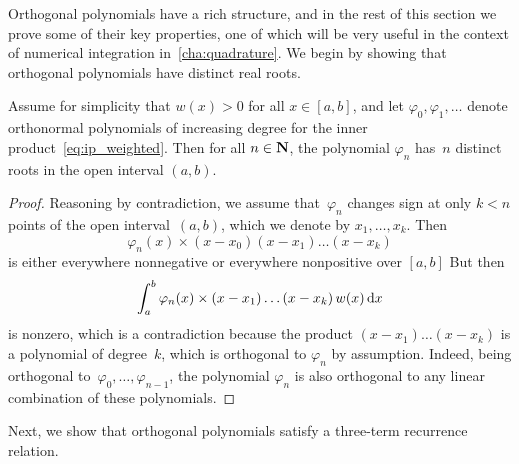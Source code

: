 Orthogonal polynomials have a rich structure,
and in the rest of this section we prove some of their key properties,
one of which will be very useful in the context of numerical integration in~\cref{cha:quadrature}.
We begin by showing that
orthogonal polynomials have distinct real roots.
\begin{proposition}
    \label{proposition:distinct_roots}
    Assume for simplicity that $w(x) > 0$ for all $x \in [a, b]$,
    and let $\varphi_0, \varphi_1, \dotsc$ denote orthonormal polynomials of increasing degree for the inner product~\eqref{eq:ip_weighted}.
    Then for all $n \in \mathbf N$,
    the polynomial $\varphi_n$ has~$n$ distinct roots in the open interval $(a, b)$.
\end{proposition}
\begin{proof}
    Reasoning by contradiction,
    we assume that~$\varphi_n$ changes sign at only $k < n$ points of the open interval~$(a, b)$,
    which we denote by $x_1, \dotsc, x_k$.
    Then
    \[
        \varphi_n(x) \times (x - x_0) (x - x_1) \dotsc (x - x_k)
    \]
    is either everywhere nonnegative or everywhere nonpositive over $[a, b]$
    But then
    \[
        \int_{a}^{b} \varphi_n(x) \times (x - x_1)  \dotsc (x - x_k) \, w(x) \, \mathrm d x
    \]
    is nonzero,
    which is a contradiction because the product $(x-x_1) \dotsc (x-x_k)$ is a polynomial of degree~$k$,
    which is orthogonal to $\varphi_n$ by assumption.
    Indeed, being orthogonal to~$\varphi_0, \dotsc, \varphi_{n-1}$,
    the polynomial $\varphi_n$ is also orthogonal to any linear combination of these polynomials.
\end{proof}

Next, we show that orthogonal polynomials satisfy a three-term recurrence relation.

